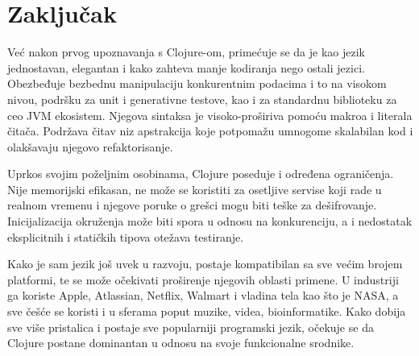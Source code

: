 \section{Zaključak}
\label{sec:zakljucak}

Već nakon prvog upoznavanja s Clojure-om, primećuje se da je kao jezik jednostavan, elegantan i kako zahteva manje kodiranja nego ostali jezici. Obezbeđuje bezbednu manipulaciju konkurentnim podacima i to na visokom nivou, podršku za unit i generativne testove, kao i za standardnu biblioteku za ceo JVM ekosistem. Njegova sintaksa je visoko-proširiva pomoću makroa i literala čitača. Podržava čitav niz apstrakcija koje potpomažu umnogome skalabilan kod i olakšavaju njegovo refaktorisanje.

Uprkos svojim poželjnim osobinama, Clojure poseduje i određena ograničenja. Nije memorijski efikasan, ne može se koristiti za osetljive servise koji rade u realnom vremenu i njegove poruke o grešci mogu biti teške za dešifrovanje. Inicijalizacija okruženja može biti spora u odnosu na konkurenciju, a i nedostatak eksplicitnih i statičkih  tipova otežava testiranje.

Kako je sam jezik još uvek u razvoju, postaje kompatibilan sa sve većim brojem platformi, te se može  očekivati proširenje njegovih oblasti primene. U industriji ga koriste Apple, Atlassian, Netflix, Walmart i vladina tela kao što je NASA, a sve češće se koristi i u sferama poput muzike, videa, bioinformatike. Kako dobija sve više pristalica i postaje sve popularniji programski jezik, očekuje se da Clojure postane dominantan u odnosu na  svoje funkcionalne srodnike.
